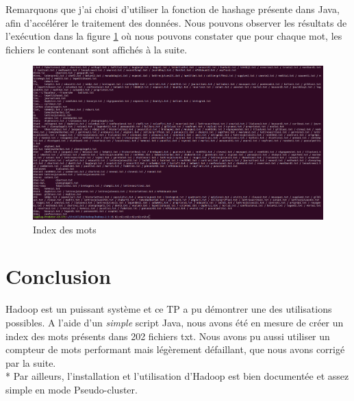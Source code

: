 \documentclass{article}
\begin{document}
Remarquons que j'ai choisi d'utiliser la fonction de hashage pr\'{e}sente dans Java, afin d'acc\'{e}l\'{e}rer le traitement des donn\'{e}es. Nous pouvons observer les r\'{e}sultats de l'ex\'{e}cution dans la figure \ref{fig:goodResults} o\`{u} nous pouvons constater que pour chaque mot, les fichiers le contenant sont affich\'{e}s \`{a} la suite.

\begin{figure}[h]
\begin{center}
\includegraphics[width=1\textwidth]{GoodResults}
\caption{Index des mots}
\label{fig:goodResults}
\end{center}
\end{figure}

\pagebreak


\section{Conclusion}

Hadoop est un puissant syst\`{e}me et ce TP a pu d\'{e}montrer une des utilisations possibles. A l'aide d'un \textit{simple} script Java, nous avons \'{e}t\'{e} en mesure de cr\'{e}er un index des mots pr\'{e}sents dans 202 fichiers txt. Nous avons pu aussi utiliser un compteur de mots performant mais l\'{e}g\`{e}rement d\'{e}faillant, que nous avons corrig\'{e} par la suite. \\*
Par ailleurs, l'installation et l'utilisation d'Hadoop est bien document\'{e}e et assez simple  en mode Pseudo-cluster.


%
%
%

\end{document}
